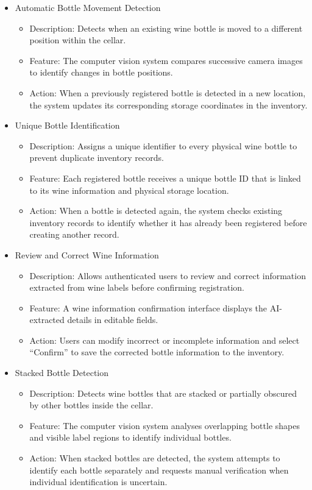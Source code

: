 \documentclass[conference]{IEEEtran}
\begin{document}
\begin{itemize}
    \item Automatic Bottle Movement Detection
    \begin{itemize}
        \item Description: Detects when an existing wine bottle is moved to a different position within the cellar.
        \item Feature: The computer vision system compares successive camera images to identify changes in bottle positions.
        \item Action: When a previously registered bottle is detected in a new location, the system updates its corresponding storage coordinates in the inventory.
    \end{itemize}

    \item Unique Bottle Identification
    \begin{itemize}
        \item Description: Assigns a unique identifier to every physical wine bottle to prevent duplicate inventory records.
        \item Feature: Each registered bottle receives a unique bottle ID that is linked to its wine information and physical storage location.
        \item Action: When a bottle is detected again, the system checks existing inventory records to identify whether it has already been registered before creating another record.
    \end{itemize}

    \item Review and Correct Wine Information
    \begin{itemize}
        \item Description: Allows authenticated users to review and correct information extracted from wine labels before confirming registration.
        \item Feature: A wine information confirmation interface displays the AI-extracted details in editable fields.
        \item Action: Users can modify incorrect or incomplete information and select ``Confirm'' to save the corrected bottle information to the inventory.
    \end{itemize}

    \item Stacked Bottle Detection
    \begin{itemize}
        \item Description: Detects wine bottles that are stacked or partially obscured by other bottles inside the cellar.
        \item Feature: The computer vision system analyses overlapping bottle shapes and visible label regions to identify individual bottles.
        \item Action: When stacked bottles are detected, the system attempts to identify each bottle separately and requests manual verification when individual identification is uncertain.
    \end{itemize}


\end{itemize}
\end{document}

